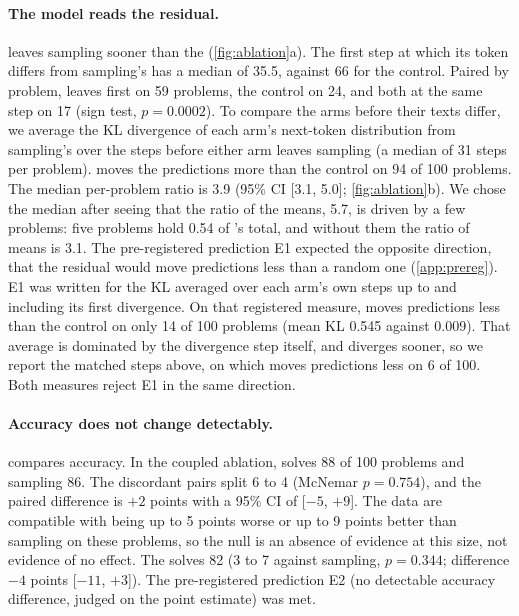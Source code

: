 \paragraph{The model reads the residual.}
\ST{} leaves sampling sooner than the \ctrl{} (\cref{fig:ablation}a).
The first step at which its token differs from sampling's has a median of 35.5, against 66 for the control. %
Paired by problem, \ST{} leaves first on 59 problems, the control on 24, and both at the same step on 17 %
(sign test, $p = 0.0002$). %
To compare the arms before their texts differ, we average the KL divergence of each arm's next-token
distribution from sampling's over the steps before either arm leaves sampling
(a median of 31 steps per problem). %
\ST{} moves the predictions more than the control on 94 of 100 problems. %
The median per-problem ratio is 3.9 (95\% CI [3.1, 5.0]; \cref{fig:ablation}b). %
We chose the median after seeing that the ratio of the means, 5.7, is driven by a few problems: %
five problems hold 0.54 of \ST{}'s total, and without them the ratio of means is 3.1. %
The pre-registered prediction E1 expected the opposite direction, that the residual would move predictions less than
a random one (\cref{app:prereg}).
E1 was written for the KL averaged over each arm's own steps up to and including its first divergence.
On that registered measure, \ST{} moves predictions less than the control on only 14 of 100 problems %
(mean KL 0.545 against 0.009). %
That average is dominated by the divergence step itself, and \ST{} diverges sooner, so we report the matched
steps above, on which \ST{} moves predictions less on 6 of 100. %
Both measures reject E1 in the same direction.

\paragraph{Accuracy does not change detectably.}
 compares accuracy.
In the coupled ablation, \ST{} solves 88 of 100 problems and sampling 86. %
The discordant pairs split 6 to 4 (McNemar $p = 0.754$), %
and the paired difference is $+2$ points with a 95\% CI of [$-5$, $+9$]. %
The data are compatible with \GST{} being up to 5 points worse or up to 9 points better than sampling on these %
problems, so the null is an absence of evidence at this size, not evidence of no effect.
The \ctrl{} solves 82 (3 to 7 against sampling, $p = 0.344$; difference $-4$ points [$-11$, $+3$]). %
The pre-registered prediction E2 (no detectable accuracy difference, judged on the point estimate) was met.

